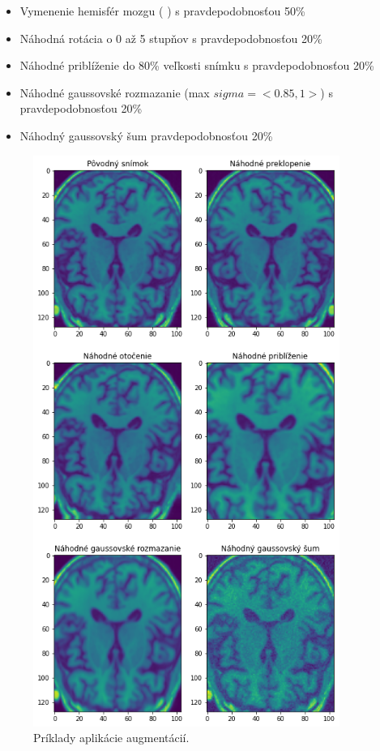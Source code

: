 \begin{itemize}
    \item Vymenenie hemisfér mozgu (\citeauthor*{esmaeilzadeh2018end} \cite{esmaeilzadeh2018end}) s pravdepodobnosťou 50\%
    \item Náhodná rotácia o 0 až 5 stupňov s pravdepodobnosťou 20\%
    \item Náhodné priblíženie do 80\% veľkosti snímku s pravdepodobnosťou 20\%
    \item Náhodné gaussovské rozmazanie (max $sigma = <0.85, 1>$) s pravdepodobnosťou 20\%
    \item Náhodný gaussovský šum pravdepodobnosťou 20\%
\end{itemize}

\begin{figure}[H]
    \centering
    \includegraphics[width=10cm]{assets/images/augmentations.png}
    \caption{Príklady aplikácie augmentácií.}
    \label{fig:augmentations}
\end{figure}


